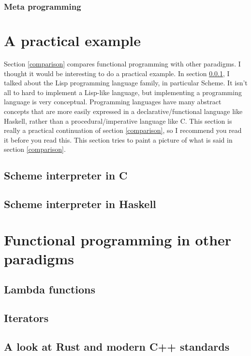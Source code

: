\documentclass[11pt]{article}
\begin{document}
\subsubsection{Meta programming}\label{metaprogramming}

\section{A practical example}

Section \ref{comparison} compares functional programming with other paradigms.
I thought it would be interesting to do a practical example. In section
\ref{metaprogramming}, I talked about the Lisp programming language family, in
particular Scheme. It isn't all to hard to implement a Lisp-like language, but
implementing a programming language is very conceptual. Programming languages
have many abstract concepts that are more easily expressed in a
declarative/functional language like Haskell, rather than a
procedural/imperative language like C. This section is really a practical
continuation of section \ref{comparison}, so I recommend you read it before you
read this. This section tries to paint a picture of what is said in section
\ref{comparison}.

\subsection{Scheme interpreter in C}

\subsection{Scheme interpreter in Haskell}

\section{Functional programming in other paradigms}

\subsection{Lambda functions}

\subsection{Iterators}

\subsection{A look at Rust and modern C++ standards}
\end{document}
